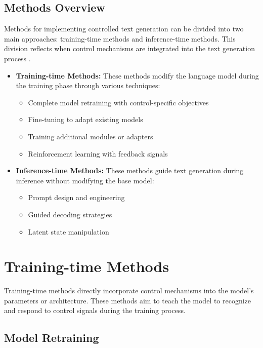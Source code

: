 \subsection{Methods Overview}

Methods for implementing controlled text generation can be divided into two main approaches: training-time methods and inference-time methods. 
This division reflects when control mechanisms are integrated into the text generation process \cite{liang2024controllabletextgenerationlarge, he-etal-2022-ctrlsum}.

\begin{itemize}
   \item \textbf{Training-time Methods:} These methods modify the language model during the training phase through various techniques:
        \begin{itemize}
            \item Complete model retraining with control-specific objectives
            \item Fine-tuning to adapt existing models
            \item Training additional modules or adapters
            \item Reinforcement learning with feedback signals
        \end{itemize}
       
   \item \textbf{Inference-time Methods:} These methods guide text generation during inference without modifying the base model:
       \begin{itemize}
            \item Prompt design and engineering
            \item Guided decoding strategies
            \item Latent state manipulation
        \end{itemize}
\end{itemize}

\section{Training-time Methods}
\label{c2:s:training-time}

Training-time methods directly incorporate control mechanisms into the model's parameters or architecture. These methods aim to teach the model to recognize and respond to control signals during the training process.

\subsection{Model Retraining}

